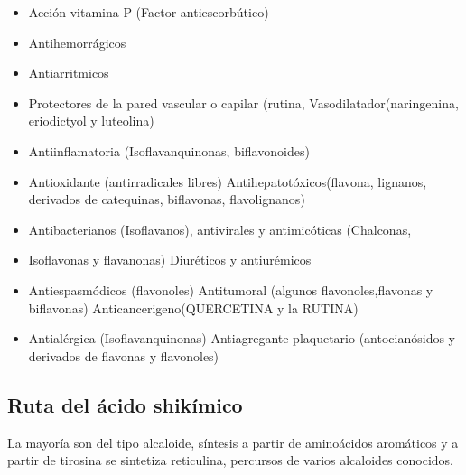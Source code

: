 \begin{itemize}
    \item Acción vitamina P (Factor antiescorbútico)
    \item Antihemorrágicos
    \item Antiarritmicos
    \item Protectores de la pared vascular o capilar (rutina, Vasodilatador(naringenina, eriodictyol y luteolina)
    \item Antiinflamatoria (Isoflavanquinonas, biflavonoides)
    \item Antioxidante (antirradicales libres) Antihepatotóxicos(flavona, lignanos, derivados de catequinas, biflavonas, flavolignanos)
    \item Antibacterianos (Isoflavanos), antivirales y antimicóticas (Chalconas,
    \item Isoflavonas y flavanonas) Diuréticos y antiurémicos
    \item Antiespasmódicos (flavonoles) Antitumoral (algunos flavonoles,flavonas y biflavonas) Anticancerigeno(QUERCETINA y la RUTINA)
    \item Antialérgica (Isoflavanquinonas) Antiagregante plaquetario (antocianósidos y derivados de flavonas y flavonoles)
\end{itemize}

\subsection{Ruta del ácido shikímico}

La mayoría son del tipo alcaloide, síntesis a partir de aminoácidos aromáticos y a partir de tirosina se sintetiza reticulina, percursos de varios alcaloides conocidos.

